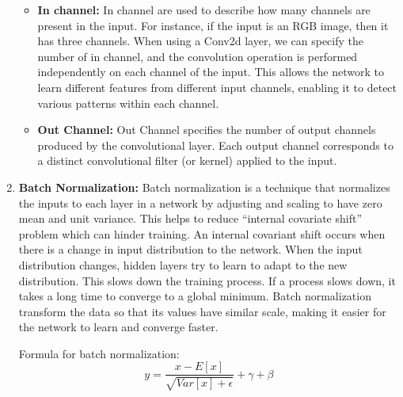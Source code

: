 \begin{enumerate}
\begin{itemize}
            \item {\bf In channel:} In channel are used to describe how many channels are present in the input. For instance, if the input is an RGB image, then it has three channels. When using a Conv2d layer, we can specify the number of in channel, and the convolution operation is performed independently on each channel of the input. This allows the network to learn different features from different input channels, enabling it to detect various patterns within each channel.
            \item {\bf Out Channel:} Out Channel specifies the number of output channels produced by the convolutional layer. Each output channel corresponds to a distinct convolutional filter (or kernel) applied to the input.
        \end{itemize}
        \item {\bf Batch Normalization:} Batch normalization is a technique that normalizes the inputs to each layer in a network by adjusting and scaling to have zero mean and unit variance. This helps to reduce “internal covariate shift” problem which can hinder training. An internal covariant shift occurs when there is a change in input distribution to the network. When the input distribution changes, hidden layers try to learn to adapt to the new distribution. This slows down the training process. If a process slows down, it takes a long time to converge to a global minimum. Batch normalization transform the data so that its values have similar scale, making it easier for the network to learn and converge faster. \par
        Formula for batch normalization:      
        \begin{equation}
        y = \frac{x - E [x]}{\sqrt{Var[x] + \epsilon }}+\gamma + \beta    
        \end{equation}      
         

\end{enumerate}
